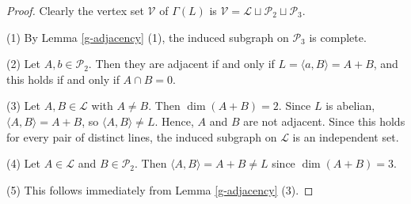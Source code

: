 \documentclass[11pt]{amsart}
\theoremstyle{plain}
\begin{document}
\begin{proof}
Clearly the vertex set $\mathcal{V}$ of $\Gamma(L)$ is $\mathcal{V} = \mathcal{L} \sqcup \mathcal{P}_2 \sqcup \mathcal{P}_3$.

\smallskip

\noindent (1) By Lemma \ref{g-adjacency} (1), the induced subgraph on $\mathcal{P}_3$ is complete.


\smallskip

\noindent (2) Let $A, b\in \mathcal{P}_2$. Then they are adjacent if and only if $L=\langle a,B\rangle = A+B$, and this holds if and only if $A\cap B=0$.

\smallskip

\noindent (3) Let $A, B\in \mathcal{L}$ with $A\neq B$. Then $\dim(A+B)=2$. Since $L$ is abelian, $\langle A,B\rangle =A+B$, so $\langle A,B\rangle \neq L$. Hence, $A$ and $B$ are not adjacent. Since this holds for every pair of distinct lines, the induced subgraph on $\mathcal{L}$ is an independent set.

\smallskip

\noindent (4) Let $A\in \mathcal{L}$ and $B\in \mathcal{P}_2$. Then $\langle A,B\rangle =A+B\neq L$ since $\dim (A+B)=3$.

\smallskip

\noindent (5) This follows immediately from Lemma \ref{g-adjacency} (3).


\smallskip

\end{proof}
\end{document}
